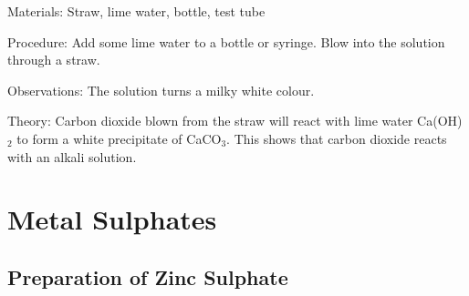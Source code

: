 \begin{multicols}{2}
\begin{description*}
\item[Materials:]{Straw, lime water, bottle, test tube}
\item[Procedure:]{Add some lime water to a bottle or syringe. Blow into the solution through a straw.}
\item[Observations:]{The solution turns a milky white colour.}
\item[Theory:]{Carbon dioxide blown from the straw will react with lime water Ca(OH)$_2$ to
form a white precipitate of CaCO$_3$. This shows that carbon dioxide reacts
with an alkali solution.}
\end{description*}

\columnbreak




\section*{Metal Sulphates}


\subsection{Preparation of Zinc Sulphate} 



\end{multicols}
